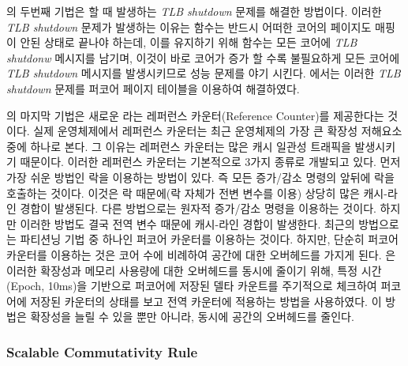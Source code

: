 의 두번째 기법은 할 때 발생하는 \textit{TLB shutdown} 문제를 해결한
방법이다.
이러한 \textit{TLB shutdown} 문제가 발생하는 이유는  함수는 반드시 어떠한 코어의 페이지도 매핑이 
안된 상태로 끝나야 하는데, 이를 유지하기 위해  함수는 모든 코어에 \textit{TLB shutdonw} 메시지를
남기며, 이것이 바로 코어가 증가 할 수록 불필요하게 모든 코어에 \textit{TLB shutdown} 메시지를 발생시키므로 
성능 문제를 야기 시킨다.
에서는 이러한 \textit{TLB shutdown} 문제를 퍼코어 페이지 테이블을 이용하여 해결하였다. 

의 마지막 기법은 새로운 라는 레퍼런스 카운터(Reference Counter)를 제공한다는
것이다.
실제 운영체제에서 레퍼런스 카운터는 최근 운영체제의 가장 큰 확장성 저해요소 중에 하나로 본다.
그 이유는 레퍼런스 카운터는 많은 캐시 일관성 트래픽을 발생시키기 때문이다.
이러한 레퍼런스 카운터는 기본적으로 3가지 종류로 개발되고 있다. 
먼저 가장 쉬운 방법인 락을 이용하는 방법이 있다. 
즉 모든 증가/감소 명령의 앞뒤에 락을 호출하는 것이다. 
이것은 락 때문에(락 자체가 전변 변수를 이용) 상당히 많은 캐시-라인 경합이 발생된다. 
다른 방법으로는 원자적 증가/감소 명령을 이용하는 것이다. 
하지만 이러한 방법도 결국 전역 변수 때문에 캐시-라인 경합이 발생한다. 
최근의 방법으로는 파티션닝 기법 중 하나인 퍼코어 카운터를 이용하는 것이다. 
하지만, 단순히 퍼코어 카운터를 이용하는 것은 코어 수에 비례하여 공간에 대한 오버헤드를 가지게 된다.
은 이러한 확장성과 메모리 사용량에 대한 오버헤드를 동시에 줄이기 위해, 
특정 시간(Epoch, 10ms)을 기반으로 퍼코어에 저장된 델타 카운트를 
주기적으로 체크하여 퍼코어에 저장된 카운터의 상태를 보고 전역 카운터에 적용하는 방법을 사용하였다.
이 방법은 확장성을 늘릴 수 있을 뿐만 아니라, 동시에 공간의 오버헤드를 줄인다. 

\subsubsection{Scalable Commutativity Rule}

